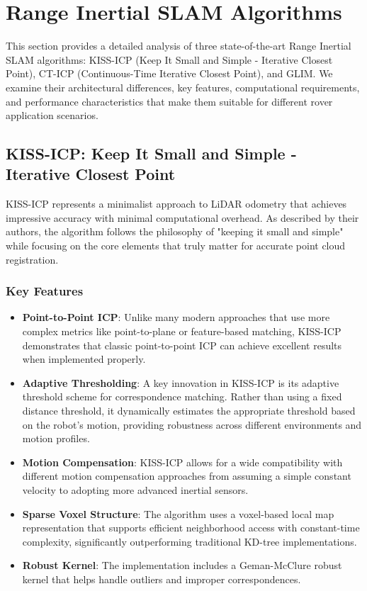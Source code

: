 \documentclass[journal]{IEEEtran}
\begin{document}
\section{Range Inertial SLAM Algorithms}

This section provides a detailed analysis of three state-of-the-art Range Inertial SLAM algorithms: KISS-ICP (Keep It Small and Simple - Iterative Closest Point), CT-ICP (Continuous-Time Iterative Closest Point), and GLIM. We examine their architectural differences, key features, computational requirements, and performance characteristics that make them suitable for different rover application scenarios.

\subsection{KISS-ICP: Keep It Small and Simple - Iterative Closest Point}

KISS-ICP represents a minimalist approach to LiDAR odometry that achieves impressive accuracy with minimal computational overhead. As described by their authors, the algorithm follows the philosophy of "keeping it small and simple" while focusing on the core elements that truly matter for accurate point cloud registration.

\subsubsection{Key Features}

\begin{itemize}
    \item \textbf{Point-to-Point ICP}: Unlike many modern approaches that use more complex metrics like point-to-plane or feature-based matching, KISS-ICP demonstrates that classic point-to-point ICP can achieve excellent results when implemented properly.

    \item \textbf{Adaptive Thresholding}: A key innovation in KISS-ICP is its adaptive threshold scheme for correspondence matching. Rather than using a fixed distance threshold, it dynamically estimates the appropriate threshold based on the robot's motion, providing robustness across different environments and motion profiles.

    \item \textbf{Motion Compensation}: KISS-ICP allows for a wide compatibility with different motion compensation approaches from assuming a simple constant velocity to adopting more advanced inertial sensors.

    \item \textbf{Sparse Voxel Structure}: The algorithm uses a voxel-based local map representation that supports efficient neighborhood access with constant-time complexity, significantly outperforming traditional KD-tree implementations.

    \item \textbf{Robust Kernel}: The implementation includes a Geman-McClure robust kernel that helps handle outliers and improper correspondences.
\end{itemize}
\end{document}
